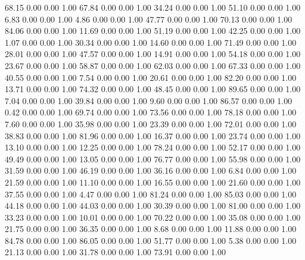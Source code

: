    68.15   0.00   0.00   1.00
   67.84   0.00   0.00   1.00
   34.24   0.00   0.00   1.00
   51.10   0.00   0.00   1.00
    6.83   0.00   0.00   1.00
    4.86   0.00   0.00   1.00
   47.77   0.00   0.00   1.00
   70.13   0.00   0.00   1.00
   84.06   0.00   0.00   1.00
   11.69   0.00   0.00   1.00
   51.19   0.00   0.00   1.00
   42.25   0.00   0.00   1.00
    1.07   0.00   0.00   1.00
   30.34   0.00   0.00   1.00
   14.60   0.00   0.00   1.00
   71.49   0.00   0.00   1.00
   28.01   0.00   0.00   1.00
   47.57   0.00   0.00   1.00
   14.91   0.00   0.00   1.00
   54.18   0.00   0.00   1.00
   23.67   0.00   0.00   1.00
   58.87   0.00   0.00   1.00
   62.03   0.00   0.00   1.00
   67.33   0.00   0.00   1.00
   40.55   0.00   0.00   1.00
    7.54   0.00   0.00   1.00
   20.61   0.00   0.00   1.00
   82.20   0.00   0.00   1.00
   13.71   0.00   0.00   1.00
   74.32   0.00   0.00   1.00
   48.45   0.00   0.00   1.00
   89.65   0.00   0.00   1.00
    7.04   0.00   0.00   1.00
   39.84   0.00   0.00   1.00
    9.60   0.00   0.00   1.00
   86.57   0.00   0.00   1.00
    0.42   0.00   0.00   1.00
   69.74   0.00   0.00   1.00
   73.56   0.00   0.00   1.00
   78.18   0.00   0.00   1.00
    7.60   0.00   0.00   1.00
   35.98   0.00   0.00   1.00
   23.39   0.00   0.00   1.00
   72.01   0.00   0.00   1.00
   38.83   0.00   0.00   1.00
   81.96   0.00   0.00   1.00
   16.37   0.00   0.00   1.00
   23.74   0.00   0.00   1.00
   13.10   0.00   0.00   1.00
   12.25   0.00   0.00   1.00
   78.24   0.00   0.00   1.00
   52.17   0.00   0.00   1.00
   49.49   0.00   0.00   1.00
   13.05   0.00   0.00   1.00
   76.77   0.00   0.00   1.00
   55.98   0.00   0.00   1.00
   31.59   0.00   0.00   1.00
   46.19   0.00   0.00   1.00
   36.16   0.00   0.00   1.00
    6.84   0.00   0.00   1.00
   21.59   0.00   0.00   1.00
   11.10   0.00   0.00   1.00
   16.55   0.00   0.00   1.00
   21.60   0.00   0.00   1.00
   37.55   0.00   0.00   1.00
    4.47   0.00   0.00   1.00
   81.24   0.00   0.00   1.00
   85.03   0.00   0.00   1.00
   44.18   0.00   0.00   1.00
   44.03   0.00   0.00   1.00
   30.39   0.00   0.00   1.00
   81.00   0.00   0.00   1.00
   33.23   0.00   0.00   1.00
   10.01   0.00   0.00   1.00
   70.22   0.00   0.00   1.00
   35.08   0.00   0.00   1.00
   21.75   0.00   0.00   1.00
   36.35   0.00   0.00   1.00
    8.68   0.00   0.00   1.00
   11.88   0.00   0.00   1.00
   84.78   0.00   0.00   1.00
   86.05   0.00   0.00   1.00
   51.77   0.00   0.00   1.00
    5.38   0.00   0.00   1.00
   21.13   0.00   0.00   1.00
   31.78   0.00   0.00   1.00
   73.91   0.00   0.00   1.00
